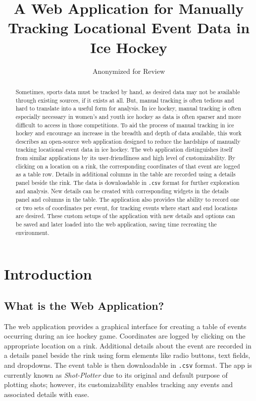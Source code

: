 \documentclass[letterpaper]{article}
\title{A Web Application for Manually Tracking Locational Event Data in Ice Hockey}
\author{Anonymized for Review}
\date{}
\begin{document}
\maketitle

\begin{abstract}
Sometimes, sports data must be tracked by hand, as desired data may not be available through existing sources, if it exists at all. But, manual tracking is often tedious and hard to translate into a useful form for analysis. In ice hockey, manual tracking is often especially necessary in women’s and youth ice hockey as data is often sparser and more difficult to access in those competitions. To aid the process of manual tracking in ice hockey and encourage an increase in the breadth and depth of data available, this work describes an open-source web application designed to reduce the hardships of manually tracking locational event data in ice hockey. The web application distinguishes itself from similar applications by its user-friendliness and high level of customizability. By clicking on a location on a rink, the corresponding coordinates of that event are logged as a table row. Details in additional columns in the table are recorded using a details panel beside the rink. The data is downloadable in \texttt{.csv} format for further exploration and analysis. New details can be created with corresponding widgets in the details panel and columns in the table. The application also provides the ability to record one or two sets of coordinates per event, for tracking events where start and end locations are desired. These custom setups of the application with new details and options can be saved and later loaded into the web application, saving time recreating the environment.
\end{abstract}

\section{Introduction}
\subsection{What is the Web Application?}
The web application provides a graphical interface for creating a table of events occurring during an ice hockey game. Coordinates are logged by clicking on the appropriate location on a rink. Additional details about the event are recorded in a details panel beside the rink using form elements like radio buttons, text fields, and dropdowns. The event table is then downloadable in \texttt{.csv} format. The app is currently known as \textit{Shot-Plotter} due to its original and default purpose of plotting shots; however, its customizability enables tracking any events and associated details with ease.
\end{document}
